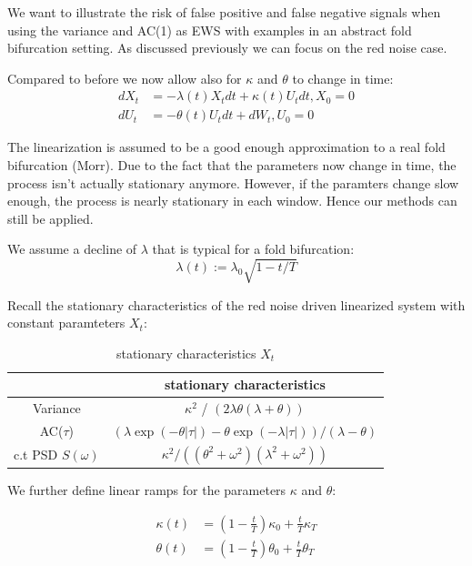\documentclass[%
thesis=student,%
coverpage=false,%
titlepage=false,%
headmarks=true, %
german,%
font=libertine, %
math=newpxtx, %
BCOR=5mm,%
coverBCOR=11mm%
]{tumbook}
\begin{document}
We want to illustrate the risk of false positive and false negative signals when using the variance and AC(1) as EWS with examples in an abstract fold bifurcation setting. As discussed previously we can focus on the red noise case.

Compared to before we now allow also for $\kappa$ and $\theta$ to change in time:
    \begin{subequations}
    \begin{align*}
        dX_{t} &= -\lambda(t) X_{t}dt + \kappa(t) U_{t}dt, X_{0} = 0 \\
        dU_{t} &= -\theta(t) U_{t}dt + dW_{t}, U_{0} = 0
    \end{align*}
    \end{subequations}

The linearization is assumed to be a good enough approximation to a real fold bifurcation (Morr). Due to the fact that the parameters now change in time, the process isn't actually stationary anymore. However, if the paramters change slow enough, the process is nearly stationary in each window. Hence our methods can still be applied.

We assume a decline of $\lambda$ that is typical for a fold bifurcation: 
    \[
    \lambda(t) := \lambda_{0}\sqrt{1-t/T}
    \]

Recall the stationary characteristics of the red noise driven linearized system with constant paramteters $X_{t}$: 

\begin{table}[h!]
\centering
\begin{tabular}{|c|c|}
\hline
& stationary characteristics\\
\hline
Variance & $\kappa^2$ / $(2\lambda\theta(\lambda + \theta))$\\
AC($\tau$) & $(\lambda\exp(-\theta\lvert\tau\rvert)-\theta\exp(-\lambda\lvert\tau\rvert))/(\lambda - \theta)$\\
c.t PSD $S(\omega)$ & $\kappa^2/((\theta^2 + \omega^2)(\lambda^2 + \omega^2))$\\
\hline
\end{tabular}
\caption{stationary characteristics $X_{t}$}
\label{tab:simple_table}
\end{table}

We further define linear ramps for the parameters $\kappa$ and $\theta$:

\begin{subequations}
    \begin{align*}
        \kappa(t) &= (1-\frac{t}{T})\kappa_{0} + \frac{t}{T}\kappa_{T} \\
        \theta(t) &= (1-\frac{t}{T})\theta_{0} + \frac{t}{T}\theta_{T}
    \end{align*}
\end{subequations}
\end{document}
